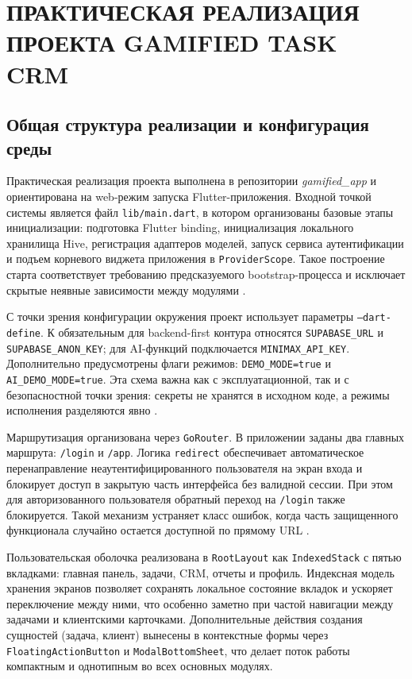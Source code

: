 \clearpage
\section{ПРАКТИЧЕСКАЯ РЕАЛИЗАЦИЯ ПРОЕКТА GAMIFIED TASK CRM}

\subsection{Общая структура реализации и конфигурация среды}

Практическая реализация проекта выполнена в репозитории \textit{gamified\_app} и ориентирована на web-режим запуска Flutter-приложения. Входной точкой системы является файл \texttt{lib/main.dart}, в котором организованы базовые этапы инициализации: подготовка Flutter binding, инициализация локального хранилища Hive, регистрация адаптеров моделей, запуск сервиса аутентификации и подъем корневого виджета приложения в \texttt{ProviderScope}. Такое построение старта соответствует требованию предсказуемого bootstrap-процесса и исключает скрытые неявные зависимости между модулями \cite{repoReadme}.

С точки зрения конфигурации окружения проект использует параметры \texttt{--dart-define}. К обязательным для backend-first контура относятся \texttt{SUPABASE\_URL} и \texttt{SUPABASE\_ANON\_KEY}; для AI-функций подключается \texttt{MINIMAX\_API\_KEY}. Дополнительно предусмотрены флаги режимов: \texttt{DEMO\_MODE=true} и \texttt{AI\_DEMO\_MODE=true}. Эта схема важна как с эксплуатационной, так и с безопасностной точки зрения: секреты не хранятся в исходном коде, а режимы исполнения разделяются явно \cite{repoReadme,owaspM4}.

Маршрутизация организована через \texttt{GoRouter}. В приложении заданы два главных маршрута: \texttt{/login} и \texttt{/app}. Логика \texttt{redirect} обеспечивает автоматическое перенаправление неаутентифицированного пользователя на экран входа и блокирует доступ в закрытую часть интерфейса без валидной сессии. При этом для авторизованного пользователя обратный переход на \texttt{/login} также блокируется. Такой механизм устраняет класс ошибок, когда часть защищенного функционала случайно остается доступной по прямому URL \cite{goRouterDocs,owaspM1}.

Пользовательская оболочка реализована в \texttt{RootLayout} как \texttt{IndexedStack} с пятью вкладками: главная панель, задачи, CRM, отчеты и профиль. Индексная модель хранения экранов позволяет сохранять локальное состояние вкладок и ускоряет переключение между ними, что особенно заметно при частой навигации между задачами и клиентскими карточками. Дополнительные действия создания сущностей (задача, клиент) вынесены в контекстные формы через \texttt{FloatingActionButton} и \texttt{ModalBottomSheet}, что делает поток работы компактным и однотипным во всех основных модулях.

